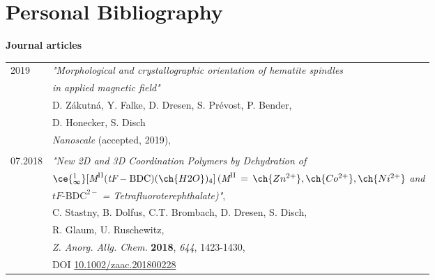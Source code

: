 \documentclass[\main/dresen_thesis.tex]{subfiles}
\begin{document}
	\section*{Personal Bibliography}

	\noindent \textbf{Journal articles}
	\begin{table}[H]
			\begin{tabular}{p{2cm}l}
				2019 			& \textit{"Morphological and crystallographic orientation of hematite spindles}\\
										  &	\textit{in applied magnetic field"}\\
											& D. Zákutná, Y. Falke, D. Dresen, S. Prévost, P. Bender,\\
											& D. Honecker, S. Disch\\
											& \textit{Nanoscale} (accepted, 2019),\\ \\
				07.2018 			& \textit{"New 2D and 3D Coordination Polymers by Dehydration of}\\
											& $\ce{^{1}_{\infty}} [ \textit{M}^{\mathrm{II}} (\textit{tF}‐\mathrm{BDC})(\ch{H2O})_4]\, (\textit{M}^{\mathrm{II}}\,=\, \ch{Zn^{2+}}, \ch{Co^{2+}}, \ch{Ni^{2+}}$ \textit{and}\\
											& $\textit{tF}‐\mathrm{BDC}^{2-}$ \textit{= Tetrafluoroterephthalate)"},\\
											& C. Stastny, B. Dolfus, C.T. Brombach, D. Dresen, S. Disch,\\
											& R. Glaum, U. Ruschewitz,\\
											& \textit{Z. Anorg. Allg. Chem.} \textbf{2018}, \textit{644}, 1423-1430,\\
											& DOI \href{https://doi.org/10.1002/zaac.201800228}{10.1002/zaac.201800228}
			\end{tabular}
	\end{table}

	\vspace{\baselineskip}
\end{document}
